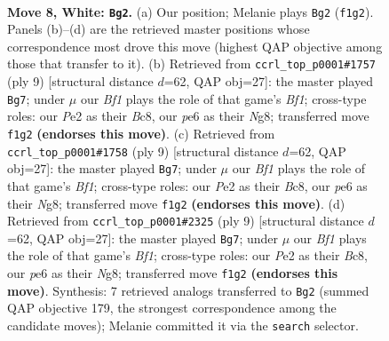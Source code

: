 \documentclass[11pt]{article}
\begin{document}
\begin{figure}[p]\centering
\begin{subfigure}{0.46\textwidth}\centering
\resizebox{\linewidth}{!}{%
\newchessgame
\chessboard[
  setfen={r1b1k2r/ppppqpp1/2n1pn2/7p/2PP4/2B2NP1/PP2PP1P/R2QKB1R w KQkq - 0 8},
  showmover=false,
  pgfstyle=straightmove, color=movearrow, markmove={f1-g2}
]}
\caption{}
\end{subfigure}\hfill
\begin{subfigure}{0.46\textwidth}\centering
\resizebox{\linewidth}{!}{%
\newchessgame
\chessboard[
  setfen={r1bqkbnr/pp1p1p1p/2n3p1/2p1p3/2P5/2N2NP1/PP1PPPBP/R1BQK2R b KQkq - 1 5},
  showmover=false,
  pgfstyle=straightmove, color=movearrow, markmove={f8-g7}
]}
\caption{}
\end{subfigure}
\\[4pt]
\begin{subfigure}{0.46\textwidth}\centering
\resizebox{\linewidth}{!}{%
\newchessgame
\chessboard[
  setfen={r1bqkbnr/pp1p1p1p/2n3p1/2p1p3/2P5/2N2NP1/PP1PPPBP/R1BQK2R b KQkq - 1 5},
  showmover=false,
  pgfstyle=straightmove, color=movearrow, markmove={f8-g7}
]}
\caption{}
\end{subfigure}\hfill
\begin{subfigure}{0.46\textwidth}\centering
\resizebox{\linewidth}{!}{%
\newchessgame
\chessboard[
  setfen={r1bqkbnr/pp1p1p1p/2n3p1/2p1p3/2P5/2N2NP1/PP1PPPBP/R1BQK2R b KQkq - 1 5},
  showmover=false,
  pgfstyle=straightmove, color=movearrow, markmove={f8-g7}
]}
\caption{}
\end{subfigure}
\caption{\textbf{Move 8, White: \texttt{Bg2}.} (a) Our position; Melanie plays \texttt{Bg2} (\texttt{f1g2}). Panels (b)--(d) are the retrieved master positions whose correspondence most drove this move (highest QAP objective among those that transfer to it). (b) Retrieved from \texttt{ccrl\_top\_p0001\#1757} (ply 9) [structural distance $d$=62, QAP obj=27]: the master played \texttt{Bg7}; under $\mu$ our \emph{Bf1} plays the role of that game's \emph{Bf1}; cross-type roles: our \emph{P}e2 as their \emph{B}c8, our \emph{p}e6 as their \emph{N}g8; transferred move \texttt{f1g2} \textbf{(endorses this move)}. (c) Retrieved from \texttt{ccrl\_top\_p0001\#1758} (ply 9) [structural distance $d$=62, QAP obj=27]: the master played \texttt{Bg7}; under $\mu$ our \emph{Bf1} plays the role of that game's \emph{Bf1}; cross-type roles: our \emph{P}e2 as their \emph{B}c8, our \emph{p}e6 as their \emph{N}g8; transferred move \texttt{f1g2} \textbf{(endorses this move)}. (d) Retrieved from \texttt{ccrl\_top\_p0001\#2325} (ply 9) [structural distance $d$=62, QAP obj=27]: the master played \texttt{Bg7}; under $\mu$ our \emph{Bf1} plays the role of that game's \emph{Bf1}; cross-type roles: our \emph{P}e2 as their \emph{B}c8, our \emph{p}e6 as their \emph{N}g8; transferred move \texttt{f1g2} \textbf{(endorses this move)}. Synthesis: 7 retrieved analogs transferred to \texttt{Bg2} (summed QAP objective 179, the strongest correspondence among the candidate moves); Melanie committed it via the \texttt{search} selector.}
\label{fig:thought-m14}
\end{figure}
\end{document}
